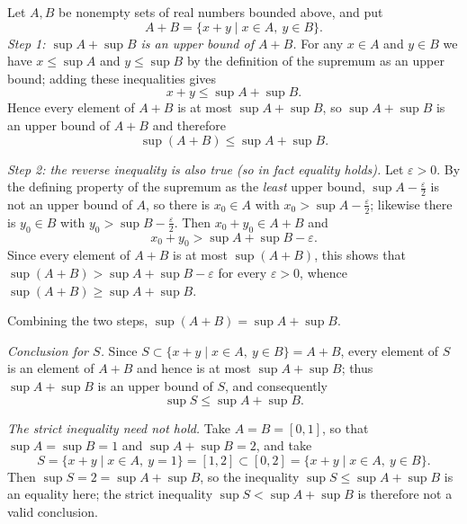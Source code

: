 \documentclass[11pt,a4paper]{article}
\newenvironment{solution}[1]{%
  \par\addvspace{1.7ex}%
  \noindent{\color{solutioncolor}\textbf{#1}}\hspace{0.55em}\ignorespaces}%
  {\par\addvspace{0.9ex}}
\begin{document}
\begin{solution}{Solution 2.4.6}\label{xs:2.4.6}
Let $A, B$ be nonempty sets of real numbers bounded above, and put
\[
A + B = \{x + y \mid x \in A,\ y \in B\}.
\]
\emph{Step 1: $\sup A + \sup B$ is an upper bound of $A + B$.} For any $x \in A$ and $y \in B$ we have $x \le \sup A$ and $y \le \sup B$ by the definition of the supremum as an upper bound; adding these inequalities gives
\[
x + y \le \sup A + \sup B .
\]
Hence every element of $A + B$ is at most $\sup A + \sup B$, so $\sup A + \sup B$ is an upper bound of $A + B$ and therefore
\[
\sup(A + B) \le \sup A + \sup B .
\]

\emph{Step 2: the reverse inequality is also true (so in fact equality holds).} Let $\varepsilon > 0$. By the defining property of the supremum as the \emph{least} upper bound, $\sup A - \frac{\varepsilon}{2}$ is not an upper bound of $A$, so there is $x_0 \in A$ with $x_0 > \sup A - \frac{\varepsilon}{2}$; likewise there is $y_0 \in B$ with $y_0 > \sup B - \frac{\varepsilon}{2}$. Then $x_0 + y_0 \in A + B$ and
\[
x_0 + y_0 > \sup A + \sup B - \varepsilon .
\]
Since every element of $A + B$ is at most $\sup(A+B)$, this shows that $\sup(A + B) > \sup A + \sup B - \varepsilon$ for every $\varepsilon > 0$, whence $\sup(A+B) \ge \sup A + \sup B$.

Combining the two steps, $\sup(A + B) = \sup A + \sup B$.

\emph{Conclusion for $S$.} Since $S \subset \{x + y \mid x \in A,\ y \in B\} = A + B$, every element of $S$ is an element of $A + B$ and hence is at most $\sup A + \sup B$; thus $\sup A + \sup B$ is an upper bound of $S$, and consequently
\[
\sup S \le \sup A + \sup B .
\]

\emph{The strict inequality need not hold.} Take $A = B = [0,1]$, so that $\sup A = \sup B = 1$ and $\sup A + \sup B = 2$, and take
\[
S = \{x + y \mid x \in A,\ y = 1\} = [1, 2] \subset [0, 2] = \{x + y \mid x \in A,\ y \in B\}.
\]
Then $\sup S = 2 = \sup A + \sup B$, so the inequality $\sup S \le \sup A + \sup B$ is an equality here; the strict inequality $\sup S < \sup A + \sup B$ is therefore not a valid conclusion.
\end{solution}
\end{document}

